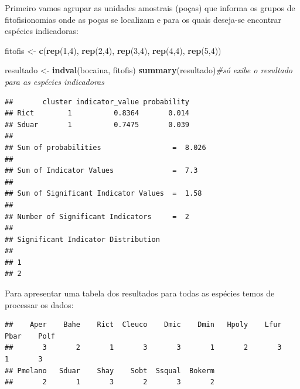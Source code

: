 \documentclass[
]{book}
\newenvironment{Shaded}{\begin{snugshade}}{\end{snugshade}}
\newcommand{\CommentTok}[1]{\textcolor[rgb]{0.56,0.35,0.01}{\textit{#1}}}
\newcommand{\DecValTok}[1]{\textcolor[rgb]{0.00,0.00,0.81}{#1}}
\newcommand{\KeywordTok}[1]{\textcolor[rgb]{0.13,0.29,0.53}{\textbf{#1}}}
\newcommand{\NormalTok}[1]{#1}
\newcommand{\OperatorTok}[1]{\textcolor[rgb]{0.81,0.36,0.00}{\textbf{#1}}}
\newcommand{\StringTok}[1]{\textcolor[rgb]{0.31,0.60,0.02}{#1}}
\begin{document}
Primeiro vamos agrupar as unidades amostrais (poças) que informa os grupos de fitofisionomias onde as poças se localizam e para os quais deseja-se encontrar espécies indicadoras:

\begin{Shaded}
\begin{Highlighting}[]
\NormalTok{fitofis <-}\StringTok{ }\KeywordTok{c}\NormalTok{(}\KeywordTok{rep}\NormalTok{(}\DecValTok{1}\NormalTok{,}\DecValTok{4}\NormalTok{), }\KeywordTok{rep}\NormalTok{(}\DecValTok{2}\NormalTok{,}\DecValTok{4}\NormalTok{), }\KeywordTok{rep}\NormalTok{(}\DecValTok{3}\NormalTok{,}\DecValTok{4}\NormalTok{), }\KeywordTok{rep}\NormalTok{(}\DecValTok{4}\NormalTok{,}\DecValTok{4}\NormalTok{), }\KeywordTok{rep}\NormalTok{(}\DecValTok{5}\NormalTok{,}\DecValTok{4}\NormalTok{))}
\end{Highlighting}
\end{Shaded}

\begin{Shaded}
\begin{Highlighting}[]
\NormalTok{resultado <-}\StringTok{ }\KeywordTok{indval}\NormalTok{(bocaina, fitofis)}
\KeywordTok{summary}\NormalTok{(resultado)}\CommentTok{#só exibe o resultado para as espécies indicadoras}
\end{Highlighting}
\end{Shaded}

\begin{verbatim}
##       cluster indicator_value probability
## Rict        1          0.8364       0.014
## Sduar       1          0.7475       0.039
## 
## Sum of probabilities                 =  8.026 
## 
## Sum of Indicator Values              =  7.3 
## 
## Sum of Significant Indicator Values  =  1.58 
## 
## Number of Significant Indicators     =  2 
## 
## Significant Indicator Distribution
## 
## 1 
## 2
\end{verbatim}

Para apresentar uma tabela dos resultados para todas as espécies temos de processar os dados:

\begin{Shaded}
\end{Shaded}

\begin{verbatim}
##    Aper    Bahe    Rict  Cleuco    Dmic    Dmin   Hpoly    Lfur    Pbar    Polf 
##       3       2       1       3       3       1       2       3       1       3 
## Pmelano   Sduar    Shay    Sobt  Ssqual  Bokerm 
##       2       1       3       2       3       2
\end{verbatim}
\end{document}
